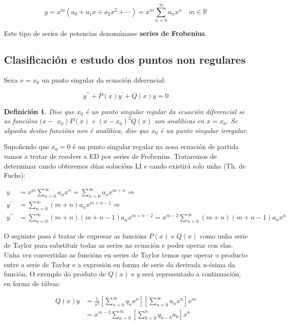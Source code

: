\documentclass[a4paper,12pt,titlepage]{article}
\newtheorem{mydef}{Definición}
\begin{document}
\begin{equation*}
    y=x^{m}\left(a_{0}+a_{1} x+a_{2} x^{2}+\cdots\right)=x^{m} \sum_{n=0}^{\infty} a_{n} x^{n} \quad m \in \mathbb{R}
\end{equation*}

Este tipo de series de potencias denomínanse \textbf{series de Frobenius}.

\subsection{Clasificación e estudo dos puntos non regulares}

Sexa $x=x_{0}$ un punto singular da ecuación diferencial:

$$
y^{\prime \prime}+P(x) y^{\prime}+Q(x) y=0
$$

\begin{mydef}
    Dise que $x_{0}$ é un punto singular regular da ecuación diferencial se as funcións $(x-$ $\left.x_{0}\right) P(x)$ e $\left(x-x_{0}\right)^{2} Q(x)$ son analíticas en $x=x_{0}$. Se algunha destas funcións non é analítica, dise que $x_{0}$ é un punto singular irregular.
\end{mydef}

Supoñendo que $x_0=0$ é un punto singular regular na nosa ecuación de partida vamos a tratar de resolver a ED por series de Frobenius. Trataremos de determinar cando obteremos dúas solucións LI e cando existirá solo unha (Th. de Fuchs):

$$
\begin{aligned}
y & =x^{m} \sum_{n=0}^{\infty} a_{n} x^{n}=\sum_{n=0}^{\infty} a_{n} x^{m+n} \Rightarrow \\
y^{\prime} & =\sum_{n=0}^{\infty}(m+n) a_{n} x^{m+n-1} \Rightarrow \\
y^{\prime \prime} & =\sum_{n=0}^{\infty}(m+n)(m+n-1) a_{n} x^{m+n-2}=x^{m-2} \sum_{n=0}^{\infty}(m+n)(m+n-1) a_{n} x^{n}
\end{aligned}
$$

O seguinte paso é tratar de expresar as funcións $P(x)$ e $Q(x)$ como unha serie de Taylor para substituír todas as series na ecuación e poder operar con elas. Unha vez convertidas as funcións en series de Taylor temos que operar o producto entre a serie de Taylor e a expresión en forma de serie da derivada n-ésima da función.  O exemplo do produto de $Q(x)$ e $y$ será representado a continuación, en forma de táboa:

$$
\begin{aligned}
    Q(x) y & =\frac{1}{x^{2}}\left[\sum_{n=0}^{\infty} q_{n} x^{n}\right]\left[\sum_{n=0}^{\infty} a_{n} x^{n}\right] x^{m} \\
    & =x^{m-2} \sum_{n=0}^{\infty}\left[\sum_{k=0}^{n} q_{n-k} a_{k}\right] x^{n}
\end{aligned}
$$
\end{document}
